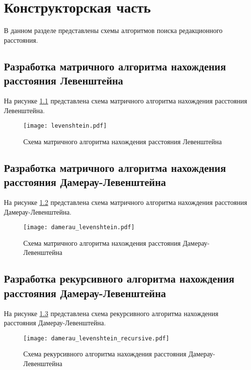 \chapter{Конструкторская часть}

В данном разделе представлены схемы алгоритмов поиска редакционного расстояния.

\section{Разработка матричного алгоритма нахождения расстояния Левенштейна}
На рисунке \ref{img:levenshtein_schema} представлена схема матричного алгоритма нахождения расстояния Левенштейна.

\begin{figure}[h!]
\centering
    \texttt{[image: levenshtein.pdf]}
    \caption{Схема матричного алгоритма нахождения расстояния Левенштейна}
    \label{img:levenshtein_schema}	
\end{figure}

\newpage

\section{Разработка матричного алгоритма нахождения расстояния Дамерау-Левенштейна}
На рисунке \ref{img:damerau_levenshtein_schema} представлена схема матричного алгоритма нахождения расстояния Дамерау-Левенштейна. 

\begin{figure}[h!]
    \centering
    \texttt{[image: damerau\_levenshtein.pdf]}
    \caption{Схема матричного алгоритма нахождения расстояния Дамерау-Левенштейна}
    \label{img:damerau_levenshtein_schema}
\end{figure}

\newpage

\section{Разработка рекурсивного алгоритма нахождения расстояния Дамерау-Левенштейна}
На рисунке \ref{img:damerau_levenshtein_recursive_schema} представлена схема рекурсивного алгоритма нахождения расстояния Дамерау-Левенштейна.

\begin{figure}[h!]
    \centering
    \texttt{[image: damerau\_levenshtein\_recursive.pdf]}
    \caption{Схема рекурсивного алгоритма нахождения расстояния Дамерау-Левенштейна}
    \label{img:damerau_levenshtein_recursive_schema}
\end{figure}


